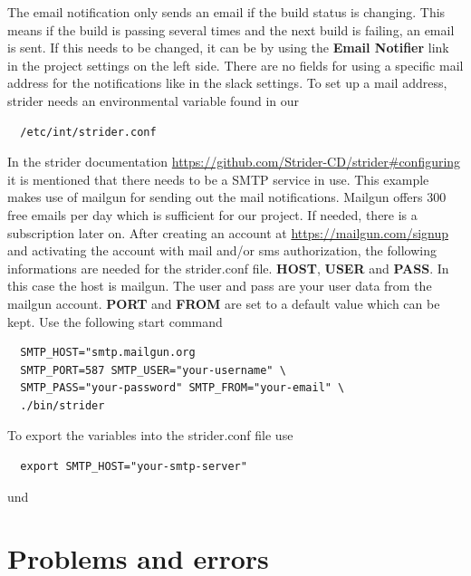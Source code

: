 The email notification only sends an email if the build status is changing. This means if the build is passing several times and the next
build is failing, an email is sent. If this needs to be changed, it can be by using the \textbf{Email Notifier} link in the project settings on the left side.
There are no fields for using a specific mail address for the notifications like in the slack settings. To set up a mail address, strider needs an environmental
variable found in our

\begin{lstlisting}
  /etc/int/strider.conf
\end{lstlisting}

In the strider documentation \url{https://github.com/Strider-CD/strider#configuring} it is mentioned that there needs to be a SMTP service in use. This
example makes use of mailgun for sending out the mail notifications. Mailgun offers 300 free emails per day which is sufficient for our project. If needed,
there is a subscription later on. After creating an account at \url{https://mailgun.com/signup} and activating the account with mail and/or sms authorization,
the following informations are needed for the strider.conf file. \textbf{HOST}, \textbf{USER} and \textbf{PASS}. In this case the host is mailgun. The user
and pass are your user data from the mailgun account. \textbf{PORT} and \textbf{FROM} are set to a default value which can be kept.
Use the following start command

\begin{lstlisting}
  SMTP_HOST="smtp.mailgun.org
  SMTP_PORT=587 SMTP_USER="your-username" \
  SMTP_PASS="your-password" SMTP_FROM="your-email" \
  ./bin/strider
\end{lstlisting}

To export the variables into the strider.conf file use

\begin{lstlisting}
  export SMTP_HOST="your-smtp-server"
\end{lstlisting}

\cite{strider} und
\cite{stridergithub}

\section{Problems and errors}
\label{section:Problems and errors}

